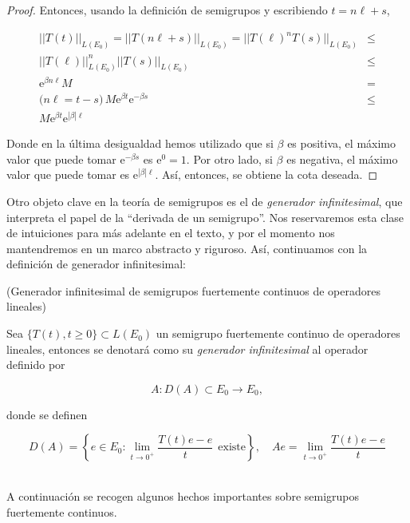 \begin{proof}
Entonces, usando la definición de semigrupos y escribiendo $t = n\ell + s$,

\begin{align*}
||T(t)||_{L(E_0)} = ||T(n\ell + s)||_{L(E_0)} = ||T(\ell)^nT(s)||_{L(E_0)} &\leq\\ ||T(\ell)||^n_{L(E_0)}||T(s)||_{L(E_0)} &\leq\\
\mathrm{e}^{\beta n \ell}M &=\\
\text{(} n\ell = t - s \text{)} \, M\mathrm{e}^{\beta t}\mathrm{e}^{-\beta s}  &\leq\\
M\mathrm{e}^{\beta t}\mathrm{e}^{|\beta| \ell}
\end{align*}


Donde en la última desigualdad hemos utilizado que si $\beta$ es positiva, el máximo valor que puede tomar $\mathrm{e}^{-\beta s}$ es $\mathrm{e}^{0} = 1$. Por otro lado, si $\beta$ es negativa, el máximo valor que puede tomar es $\mathrm{e}^{|\beta| \ell}$. Así, entonces, se obtiene la cota deseada.
\end{proof}

Otro objeto clave en la teoría de semigrupos es el de \textit{generador infinitesimal}, que interpreta el papel de la ``derivada de un semigrupo''. Nos reservaremos esta clase de intuiciones para más adelante en el texto, y por el momento nos mantendremos en un marco abstracto y riguroso. Así, continuamos con la definición de generador infinitesimal:\\

\begin{Definicion}{(Generador infinitesimal de semigrupos fuertemente continuos de operadores lineales)}
\label{ch:semigrupos:def:generador}

Sea $\{T(t), t \geq 0\} \subset L(E_0)$ un semigrupo fuertemente continuo de operadores lineales, entonces se denotará como su \textit{generador infinitesimal} al operador definido por

\[A : D(A) \subset E_0 \rightarrow E_0,\]

donde se definen

\[D(A) = \left \{e \in E_0 : \lim_{t \rightarrow 0^+} \frac{T(t)e - e}{t} \ \ \text{existe} \right \}, \quad Ae = \lim_{t\rightarrow 0^+} \frac{T(t)e - e}{t }\]\\
\end{Definicion}

A continuación se recogen algunos hechos importantes sobre semigrupos fuertemente continuos.\\

